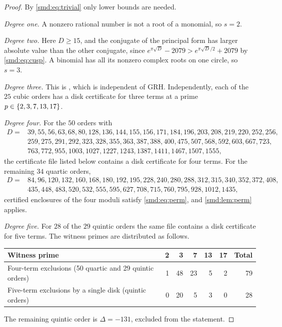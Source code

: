 \begin{proof}
By \eqref{smd:eq:trivial} only lower bounds are needed.

\emph{Degree one.} A nonzero rational number is not a root of a monomial, so $s=2$.

\emph{Degree two.} Here $D\ge15$, and the conjugate of the principal form has larger
absolute value than the other conjugate, since
$e^{\pi\sqrt D}-2079>e^{\pi\sqrt D/2}+2079$ by \eqref{smd:eq:cusp}. A binomial has all its
nonzero complex roots on one circle, so $s=3$.

\emph{Degree three.} This is \cite[Theorem~6.6]{Bilu2022Trinomials}, which is independent
of GRH. Independently, each of the $25$ cubic orders has a disk certificate for three terms
at a prime $p\in\{2,3,7,13,17\}$.

\emph{Degree four.} For the $50$ orders with
\[
\begin{aligned}
 D={}&39, 55, 56, 63, 68, 80, 128, 136, 144, 155, 156, 171, 184, 196, 203, 208, 219, 220,
 252, 256,\\
 &259, 275, 291, 292, 323, 328, 355, 363, 387, 388, 400, 475, 507, 568, 592, 603, 667,
 723,\\
 &763, 772, 955, 1003, 1027, 1227, 1243, 1387, 1411, 1467, 1507, 1555,
\end{aligned}
\]
the certificate file listed below contains a disk certificate for four terms. For the
remaining $34$ quartic orders,
\[
\begin{aligned}
 D={}&84, 96, 120, 132, 160, 168, 180, 192, 195, 228, 240, 280, 288, 312, 315, 340, 352,
 372, 408,\\
 &435, 448, 483, 520, 532, 555, 595, 627, 708, 715, 760, 795, 928, 1012, 1435,
\end{aligned}
\]
certified enclosures of the four moduli satisfy \eqref{smd:eq:perm}, and
\cref{smd:lem:perm} applies.

\emph{Degree five.} For $28$ of the $29$ quintic orders the same file contains a disk
certificate for five terms. The witness primes are distributed as follows.
\begin{center}
\begin{tabular}{lrrrrrr}
\toprule
Witness prime&2&3&7&13&17&Total\\
\midrule
Four-term exclusions (50 quartic and 29 quintic orders)&1&48&23&5&2&79\\
Five-term exclusions by a single disk (quintic orders)&0&20&5&3&0&28\\
\bottomrule
\end{tabular}
\end{center}
The remaining quintic order is $\Delta=-131$, excluded from the statement.
\end{proof}

